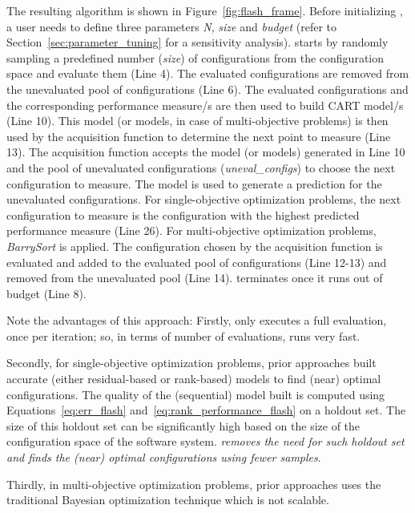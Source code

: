 The resulting algorithm is shown in  Figure~\ref{fig:flash_frame}. 
Before initializing \flash, a user needs to define three parameters \textit{N}, \textit{size} and \textit{budget} (refer to Section~\ref{sec:parameter_tuning} for a sensitivity analysis). \flash starts by randomly sampling a predefined number (\textit{size}) of configurations from the configuration space and evaluate them (Line 4). The evaluated configurations are removed from the unevaluated pool of configurations (Line 6). The evaluated configurations and the corresponding performance measure/s are then used to build CART model/s (Line 10). This model (or models, in case of multi-objective problems) is then used by the acquisition function to determine the next point to measure (Line 13). The acquisition function accepts the model (or models) generated in Line 10 and the pool of unevaluated configurations (\textit{uneval\_configs}) to choose the next configuration to measure. The model is used to generate a prediction for the unevaluated configurations. 
For single-objective optimization problems, the next configuration to measure is the configuration with the highest predicted performance measure (Line 26). For multi-objective optimization problems, 
{\em BarrySort} is applied. The configuration chosen by the acquisition function is evaluated and added to the evaluated pool of configurations (Line 12-13) and removed from the unevaluated pool (Line 14). \flash terminates once it runs out of budget (Line 8). 


Note the advantages of this approach:
Firstly,
\flash only executes a full evaluation, once per iteration; so, in terms of number of evaluations,
\flash  runs very fast. 

Secondly,  
for single-objective optimization problems,   prior approaches built accurate (either residual-based or rank-based) models to find (near) optimal configurations. The quality of the (sequential) model built is computed using Equations~\ref{eq:err_flash} and~\ref{eq:rank_performance_flash} on a holdout set. The size of this holdout set can be significantly high based on the size of the configuration space of the software system. \textit{\flash removes the need for such holdout set and finds the (near) optimal configurations using fewer samples}. 

Thirdly, in multi-objective optimization problems,   prior approaches uses the traditional Bayesian optimization technique which is not scalable. 

